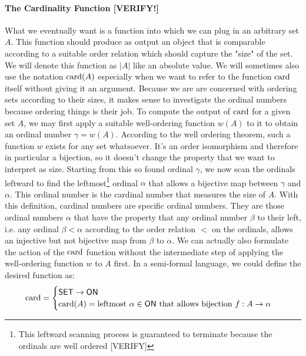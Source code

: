 
\paragraph{The Cardinality Function [VERIFY!]}
What we eventually want is a function into which we can plug in an arbitrary set $A$. This function should produce as output an object that is comparable according to a suitable order relation which should capture the "size" of the set. We will denote this function as $|A|$ like an absolute value. We will sometimes also use the notation $\operatorname{card}(A)$ especially when we want to refer to the function $\operatorname{card}$ itself without giving it an argument. Because we are are concerned with ordering sets according to their sizes, it makes sense to investigate the ordinal numbers because ordering things is their job. To compute the output of $\operatorname{card}$ for a given set $A$, we may first apply a suitable well-ordering function $w(A)$ to it to obtain an ordinal number $\gamma = w(A)$. According to the well ordering theorem, such a function $w$ exists for any set whatsoever. It's an order isomorphism and therefore in particular a bijection, so it doesn't change the property that we want to interpret as size. Starting from this so found ordinal $\gamma$, we now scan the ordinals leftward to find the leftmost\footnote{This leftward scanning process is guaranteed to terminate because the ordinals are well ordered [VERIFY]} ordinal $\alpha$ that allows a bijective map between $\gamma$ and $\alpha$. This ordinal number is the cardinal number that measures the size of $A$. With this definition, cardinal numbers are specific ordinal numbers. They are those ordinal numbers $\alpha$ that have the property that any ordinal number $\beta$ to their left, i.e. any ordinal $\beta < \alpha$ according to the order relation $<$ on the ordinals, allows an injective but not bijective map from $\beta$ to $\alpha$. We can actually also formulate the action of the $\operatorname{card}$ function without the intermediate step of applying the well-ordering function $w$ to $A$ first. In a semi-formal language, we could define the desired function as:
\begin{equation}
\operatorname{card} = 
\begin{cases}
\mathsf{SET} \rightarrow \mathsf{ON} \\
\operatorname{card}(A) = \text{leftmost } \alpha \in \mathsf{ON} \text{ that allows bijection } 
           f: A \rightarrow \alpha
\end{cases}
\end{equation}
